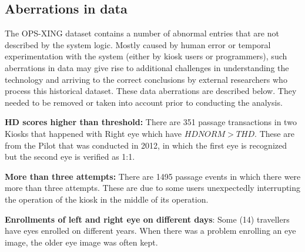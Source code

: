 \documentclass{cta-author}%
\newcommand{\cmt}[1]{}
\begin{document}
\cmt{
person's FAKE ID, gender, age at the time of enrollment, enrollment date (month, year, time of the day), \textbf{eye enrolled} - left or light,  \textbf{camera used} - LG (''L'') or Panasonic(``B'') and 
fourteen image quality scores, including pupil dilation score which was used in the studies conducted by NIST and UND 

}

\subsection{Aberrations in data}


The OPS-XING dataset contains a number of abnormal entries that are not described by the system logic. 
Mostly caused by human error or temporal experimentation with the system (either by kiosk users or programmers), such aberrations in data may give rise to additional challenges in understanding the technology and arriving to the correct conclusions by  external researchers who  process this historical dataset. These data aberrations are described below. 
They needed to be removed or taken into account  prior to conducting the analysis. 

\textbf{HD scores higher than threshold:} There are 351 passage transactions in two Kiosks 
that happened with Right eye  which have $HDNORM > THD$. These are from the Pilot  that was conducted in 2012, in which the first eye is recognized but the second eye is verified as 1:1. 

\textbf{More than three  attempts:} There are 1495 passage events in which there were more than three  attempts.
These are due to  some users unexpectedly interrupting the operation of the kiosk in the middle of its operation.

\textbf{Enrollments of left and right eye on different days}: Some 
(14) 
travellers have eyes enrolled on different years.  When there was a problem enrolling an eye image, the older eye image was often kept.
\end{document}
